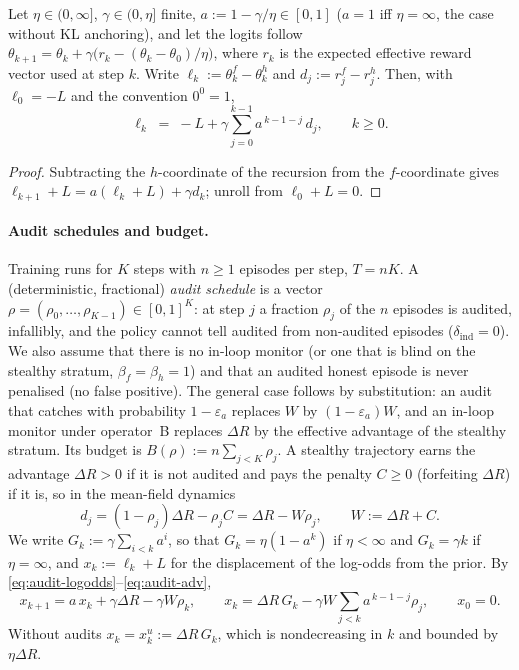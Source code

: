 \begin{lemma}\label{lem:audit-logodds}
Let $\eta\in(0,\infty]$, $\gamma\in(0,\eta]$ finite, $a:=1-\gamma/\eta\in[0,1]$
($a=1$ iff $\eta=\infty$, the case without KL anchoring), and let the logits
follow $\theta_{k+1}=\theta_k+\gamma\bigl(r_k-(\theta_k-\theta_0)/\eta\bigr)$,
where $r_k$ is the expected effective reward vector used at step $k$. Write
$\ell_k:=\theta_k^{f}-\theta_k^{h}$ and $d_j:=r_j^{f}-r_j^{h}$. Then, with
$\ell_0=-L$ and the convention $0^0=1$,
\begin{equation}\label{eq:audit-logodds}
  \ell_k \;=\; -L+\gamma\sum_{j=0}^{k-1}a^{\,k-1-j}\,d_j ,\qquad k\ge 0 .
\end{equation}
\end{lemma}
\begin{proof}
Subtracting the $h$-coordinate of the recursion from the $f$-coordinate gives
$\ell_{k+1}+L=a(\ell_k+L)+\gamma d_k$; unroll from $\ell_0+L=0$.
\end{proof}

\paragraph{Audit schedules and budget.} Training runs for $K$ steps with $n\ge1$
episodes per step, $T=nK$. A (deterministic, fractional) \emph{audit schedule}
is a vector $\rho=(\rho_0,\dots,\rho_{K-1})\in[0,1]^K$: at step $j$ a fraction
$\rho_j$ of the $n$ episodes is audited, infallibly, and the policy cannot tell
audited from non-audited episodes ($\delta_{\mathrm{ind}}=0$). We also assume that there is no in-loop monitor (or one that is blind on the stealthy stratum, $\beta_f=\beta_h=1$) and that an audited honest episode is never penalised (no false positive). The general case follows by substitution: an audit that catches with probability $1-\varepsilon_a$ replaces $W$ by $(1-\varepsilon_a)W$, and an in-loop monitor under operator~B replaces $\Delta R$ by the effective advantage of the stealthy stratum. Its budget is
$B(\rho):=n\sum_{j<K}\rho_j$. A stealthy trajectory earns the advantage
$\Delta R>0$ if it is not audited and pays the penalty $C\ge0$ (forfeiting
$\Delta R$) if it is, so in the mean-field dynamics
\begin{equation}\label{eq:audit-adv}
  d_j=(1-\rho_j)\Delta R-\rho_j C=\Delta R-W\rho_j,\qquad W:=\Delta R+C .
\end{equation}
We write $G_k:=\gamma\sum_{i<k}a^i$, so that $G_k=\eta(1-a^k)$ if $\eta<\infty$
and $G_k=\gamma k$ if $\eta=\infty$, and $x_k:=\ell_k+L$ for the displacement of
the log-odds from the prior. By \eqref{eq:audit-logodds}--\eqref{eq:audit-adv},
\begin{equation}\label{eq:audit-x}
  x_{k+1}=a\,x_k+\gamma\Delta R-\gamma W\rho_k,\qquad
  x_k=\Delta R\,G_k-\gamma W\sum_{j<k}a^{\,k-1-j}\rho_j,\qquad x_0=0 .
\end{equation}
Without audits $x_k=x^{u}_k:=\Delta R\,G_k$, which is nondecreasing in $k$ and
bounded by $\eta\Delta R$.

